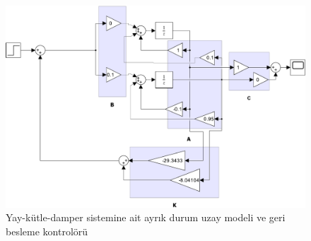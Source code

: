 \begin{figure}[!htb]
    \centering
    \includegraphics[width=\textwidth]{img/lec12_model1}
    \caption{Yay-kütle-damper sistemine ait ayrık durum uzay modeli ve geri besleme kontrolörü}
    \label{fig:lec12_model1}
\end{figure}



